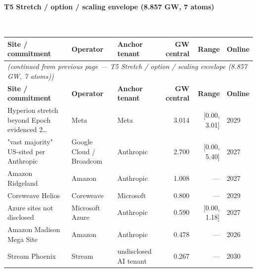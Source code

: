 \documentclass[11pt,a4paper]{article}
\begin{document}
\paragraph{\textbf{T5 Stretch / option / scaling envelope (8.857 GW, 7 atoms)}}~\\[0.3em]
\noindent\begin{small}
\begin{longtable}{@{}p{4.5cm} p{2.4cm} p{2.4cm} r r p{1.8cm}@{}}
\toprule
\textbf{Site / commitment} & \textbf{Operator} & \textbf{Anchor tenant} & \textbf{GW central} & \textbf{Range} & \textbf{Online} \\
\midrule
\endfirsthead
\multicolumn{6}{l}{\textit{(continued from previous page — T5 Stretch / option / scaling envelope (8.857 GW, 7 atoms))}} \\
\toprule
\textbf{Site / commitment} & \textbf{Operator} & \textbf{Anchor tenant} & \textbf{GW central} & \textbf{Range} & \textbf{Online} \\
\midrule
\endhead
\bottomrule
\endfoot

Hyperion stretch beyond Epoch evidenced 2… & Meta & Meta & 3.014 & [0.00, 3.01] & 2029 \\

"vast majority" US-sited per Anthropic & Google Cloud / Broadcom & Anthropic & 2.700 & [0.00, 5.40] & 2027 \\

Amazon Ridgeland & Amazon & Anthropic & 1.008 & — & 2027 \\

Coreweave Helios & Coreweave & Microsoft & 0.800 & — & 2029 \\

Azure sites not disclosed & Microsoft Azure & Anthropic & 0.590 & [0.00, 1.18] & 2027 \\

Amazon Madison Mega Site & Amazon & Anthropic & 0.478 & — & 2026 \\

Stream Phoenix & Stream & undisclosed AI tenant & 0.267 & — & 2030 \\

\end{longtable}\end{small}
\end{document}
